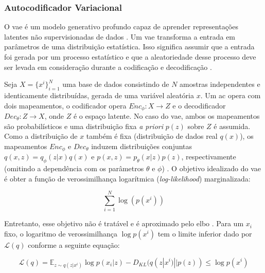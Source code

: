 

\subsubsection{Autocodificador Variacional}


O \gls{vae} \cite{kingma2013auto,rezende2014stochastic} é um modelo generativo profundo capaz de aprender representações latentes não supervisionadas de dados \cite{klys2018learning}.
Um \acrshort{vae} transforma a entrada em parâmetros de uma distribuição estatística. Isso significa assumir que a entrada foi gerada por um processo estatístico e que a aleatoriedade desse processo deve ser levada em consideração durante a codificação e decodificação \cite{FrancoisDeepLearning}.

Seja $X = \{x^i\}_{i=1}^N$ uma base de dados consistindo de $N$ amostras independentes e identicamente distribuídas, gerada de uma variável aleatória $x$. Um \acrshort{ac} opera com dois mapeamentos, o codificador opera $Enc_{\phi}:X \rightarrow Z$ e o decodificador $Dec_{\theta}:Z \rightarrow X$, onde $Z$ é o espaço latente. No caso do \acrshort{vae}, ambos os mapeamentos são probabilísticos e uma distribuição fixa \textit{a priori} $p(z)$ sobre $Z$ é assumida. Como a distribuição de $x$ também é fixa (distribuição de dados real $q(x)$), os mapeamentos $Enc_{\phi}$ e  $Dec_{\theta}$ induzem distribuições conjuntas $q(x,z) = q_{\phi}(z|x)q(x)$ e $p(x,z) = p_{\theta}(x|z)p(z)$, respectivamente (omitindo a dependência com os parâmetros $\theta$ e $\phi$) \cite{rolinek2019variational}. O objetivo idealizado do \acrshort{vae} é obter a função de verossimilhança logarítmica (\textit{log-likelihood}) marginalizada:


\begin{equation}
\sum_{i=1}^N \log (p(x^i))
\end{equation}

Entretanto, esse objetivo não é tratável e é aproximado pelo \gls{elbo} \cite{kingma2013auto}. Para um $x_i$ fixo, o logaritmo de verossimilhança $\log p(x^i)$ tem o limite inferior dado por $\mathcal{L}(q)$ conforme a seguinte equação:

\begin{equation}
\label{elbo2}
\mathcal{L}(q) = \mathbb{E}_{z \sim q(z|x^i)} \log p(x_i|z) - D_{KL}(q(z|x^i)||p(z)) \leq \log p(x^i)
\end{equation}

